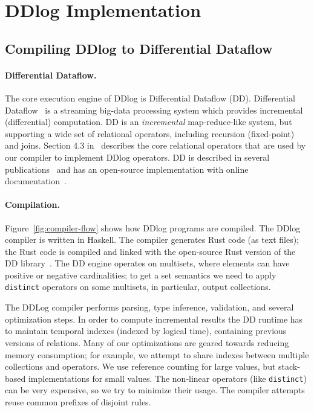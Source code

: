 \section{DDlog Implementation}\label{sec-system}

\subsection{Compiling DDlog to Differential Dataflow}

\paragraph{Differential Dataflow.}
The core execution engine of DDlog is Differential Dataflow (DD).
Differential Dataflow~\cite{differential-dataflow-paper} is a
streaming big-data processing system which provides incremental
(differential) computation.  DD is an \emph{incremental}
map-reduce-like system, but supporting a wide set of relational
operators, including recursion (fixed-point) and joins.  Section 4.3
in~\cite{differential-dataflow-paper} describes the core relational
operators that are used by our compiler to implement DDlog operators.
DD is described in several
publications~\cite{timely-dataflow,differential-dataflow-paper} and
has an open-source implementation with online
documentation~\cite{dd-mdbook,dd-reference}.

\paragraph{Compilation.}
Figure~\ref{fig:compiler-flow} shows how DDlog programs are compiled.
The DDlog compiler is written in Haskell.  The compiler generates Rust
code (as text files); the Rust code is compiled and linked with the
open-source Rust version of the DD
library~\cite{differential-dataflow}.  The DD engine operates on
multisets, where elements can have positive or negative cardinalities;
to get a set semantics we need to apply \texttt{distinct} operators on
some multisets, in particular, output collections.

The DDLog compiler performs parsing, type inference, validation, and
several optimization steps.  In order to compute incremental results
the DD runtime has to maintain temporal indexes (indexed by logical
time), containing previous versions of relations.  Many of our
optimizations are geared towards reducing memory consumption; for
example, we attempt to share indexes between multiple collections and
operators.  We use reference counting for large values, but
stack-based implementations for small values.  The non-linear
operators (like \texttt{distinct}) can be very expensive, so we try to
minimize their usage.  The compiler attempts reuse common prefixes of
disjoint rules.


